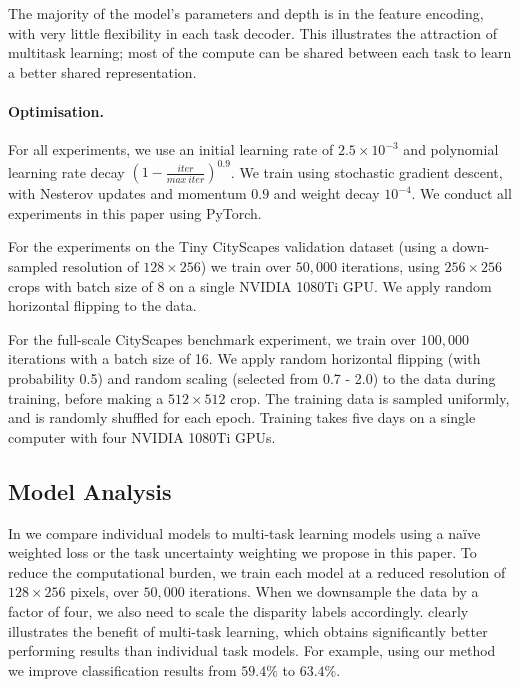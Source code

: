 The majority of the model's parameters and depth is in the feature encoding, with very little flexibility in each task decoder. This illustrates the attraction of multitask learning; most of the compute can be shared between each task to learn a better shared representation.

\paragraph{Optimisation.}
For all experiments, we use an initial learning rate of $2.5\times10^{-3}$ and polynomial learning rate decay $(1-\frac{iter}{max~iter})^{0.9}$. We train using stochastic gradient descent, with Nesterov updates and momentum $0.9$ and weight decay $10^{-4}$. We conduct all experiments in this paper using PyTorch.

For the experiments on the Tiny CityScapes validation dataset (using a down-sampled resolution of $128\times256$) we train over $50,000$ iterations, using $256 \times 256$ crops with batch size of 8 on a single NVIDIA 1080Ti GPU. We apply random horizontal flipping to the data.

For the full-scale CityScapes benchmark experiment, we train over $100,000$ iterations with a batch size of 16. We apply random horizontal flipping (with probability 0.5) and random scaling (selected from 0.7 - 2.0) to the data during training, before making a $512 \times 512$ crop. The training data is sampled uniformly, and is randomly shuffled for each epoch. Training takes five days on a single computer with four NVIDIA 1080Ti GPUs.

\subsection{Model Analysis}
\label{sec:tasks}

In  we compare individual models to multi-task learning models using a na{\"i}ve weighted loss or the task uncertainty weighting we propose in this paper. To reduce the computational burden, we train each model at a reduced resolution of $128\times256$ pixels, over $50,000$ iterations. When we downsample the data by a factor of four, we also need to scale the disparity labels accordingly.  clearly illustrates the benefit of multi-task learning, which obtains significantly better performing results than individual task models. For example, using our method we improve classification results from $59.4\%$ to $63.4\%$.

